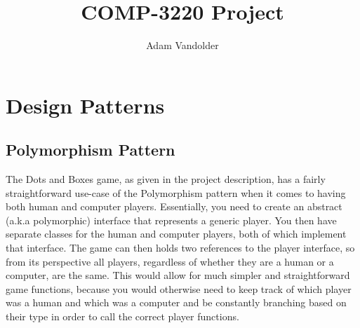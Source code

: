 \documentclass{article}
\title{COMP-3220 Project}
\author{Adam Vandolder}
\begin{document}
    \maketitle
    \linespread{1.6}
    \selectfont
    \section{Design Patterns}
    \subsection{Polymorphism Pattern}
    The Dots and Boxes game, as given in the project description, has a fairly
    straightforward use-case of the Polymorphism pattern when it comes to having
    both human and computer players. Essentially, you need to create an abstract
    (a.k.a polymorphic) interface that represents a generic player. You then
    have separate classes for the human and computer players, both of which
    implement that interface. The game can then holds two references to the
    player interface, so from its perspective all players, regardless of whether
    they are a human or a computer, are the same. This would allow for much
    simpler and straightforward game functions, because you would otherwise need
    to keep track of which player was a human and which was a computer and be
    constantly branching based on their type in order to call the correct player
    functions.
    \newpage
\end{document}
